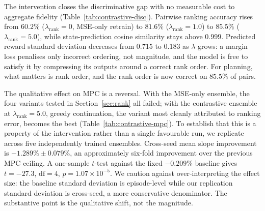 \documentclass[11pt]{article}
\begin{document}
The intervention closes the discriminative gap with no measurable cost to aggregate fidelity (Table~\ref{tab:contrastive-disc}). Pairwise ranking accuracy rises from $60.2\%$ ($\lambda_{\text{rank}}{=}0$, MSE-only retrain) to $81.6\%$ ($\lambda_{\text{rank}}{=}1.0$) to $85.5\%$ ($\lambda_{\text{rank}}{=}5.0$), while state-prediction cosine similarity stays above $0.999$. Predicted reward standard deviation decreases from $0.715$ to $0.183$ as $\lambda$ grows: a margin loss penalises only incorrect ordering, not magnitude, and the model is free to satisfy it by compressing its outputs around a correct rank order. For planning, what matters is rank order, and the rank order is now correct on $85.5\%$ of pairs.

The qualitative effect on MPC is a reversal. With the MSE-only ensemble, the four variants tested in Section~\ref{sec:rank} all failed; with the contrastive ensemble at $\lambda_{\text{rank}}{=}5.0$, greedy continuation, the variant most cleanly attributed to ranking error, becomes the best (Table~\ref{tab:contrastive-mpc}). To establish that this is a property of the intervention rather than a single favourable run, we replicate across five independently trained ensembles. Cross-seed mean slope improvement is $-1.289\% \pm 0.079\%$, an approximately six-fold improvement over the previous MPC ceiling. A one-sample $t$-test against the fixed $-0.209\%$ baseline gives $t{=}{-27.3}$, $\mathrm{df}{=}4$, $p{=}1.07\times10^{-5}$. We caution against over-interpreting the effect size: the baseline standard deviation is episode-level while our replication standard deviation is cross-seed, a more conservative denominator. The substantive point is the qualitative shift, not the magnitude.
\end{document}
